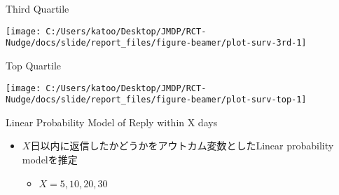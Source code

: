 \documentclass[
      aspectratio=169,
        12pt,
    ]{beamer}
\providecommand{\tightlist}{%
  \setlength{\itemsep}{0pt}\setlength{\parskip}{0pt}}
\begin{document}
\begin{frame}{Third Quartile}
\protect\hypertarget{third-quartile}{}
\begin{center}\texttt{[image: C:/Users/katoo/Desktop/JMDP/RCT-Nudge/docs/slide/report\_files/figure-beamer/plot-surv-3rd-1]} \end{center}
\end{frame}

\begin{frame}{Top Quartile}
\protect\hypertarget{top-quartile}{}
\begin{center}\texttt{[image: C:/Users/katoo/Desktop/JMDP/RCT-Nudge/docs/slide/report\_files/figure-beamer/plot-surv-top-1]} \end{center}
\end{frame}

\begin{frame}{Linear Probability Model of Reply within X days}
\protect\hypertarget{linear-probability-model-of-reply-within-x-days}{}
\begin{itemize}
\tightlist
\item
  \(X\)日以内に返信したかどうかをアウトカム変数としたLinear probability modelを推定

  \begin{itemize}
  \tightlist
  \item
    \(X = 5, 10, 20, 30\)
  \end{itemize}
\end{itemize}
\end{frame}
\end{document}
